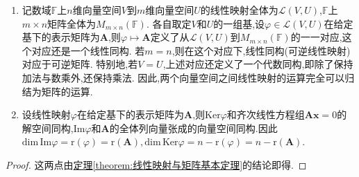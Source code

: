 \documentclass[../../main.tex]{subfiles}%
\begin{document}
\begin{corollary}\label{corollary:线性映射与矩阵基本结论}
\begin{enumerate}[(1)]
\item\label{线性映射与矩阵基本结论1} 记数域\(\mathbb{F}\)上\(n\)维向量空间\(V\)到\(m\)维向量空间\(U\)的线性映射全体为\(\mathcal{L}(V,U)\),\(\mathbb{F}\)上\(m\times n\)矩阵全体为\(M_{m\times n}(\mathbb{F})\). 各自取定\(V\)和\(U\)的一组基,设\(\varphi\in\mathcal{L}(V,U)\)在给定基下的表示矩阵为\(\boldsymbol{A}\),则\(\varphi\mapsto\boldsymbol{A}\)定义了从\(\mathcal{L}(V,U)\)到\(M_{m\times n}(\mathbb{F})\)的一一对应,这个对应还是一个线性同构. 若\(m = n\),则在这个对应下,线性同构(可逆线性映射)对应于可逆矩阵. 特别地,若\(V = U\),上述对应还定义了一个代数同构,即除了保持加法与数乘外,还保持乘法. 因此,两个向量空间之间线性映射的运算完全可以归结为矩阵的运算.

\item\label{线性映射与矩阵基本结论2} 设线性映射\(\varphi\)在给定基下的表示矩阵为\(\boldsymbol{A}\),则\(\text{Ker}\varphi\)和齐次线性方程组\(\boldsymbol{A}\boldsymbol{x}=0\)的解空间同构,\(\text{Im}\varphi\)和\(\boldsymbol{A}\)的全体列向量张成的向量空间同构.因此$\mathrm{dim}\,\mathrm{Im}\varphi =\mathrm{r}\left( \varphi \right) =\mathrm{r}\left( \boldsymbol{A} \right) ,\mathrm{dim}\,\mathrm{Ker}\varphi =n-\mathrm{r}\left( \varphi \right) =n-\mathrm{r}\left( \boldsymbol{A} \right)$.
\end{enumerate}
\end{corollary}
\begin{proof}

这两点由\hyperref[theorem:线性映射与矩阵基本定理]{定理\ref{theorem:线性映射与矩阵基本定理}}的结论即得.

\end{proof}
\end{document}
